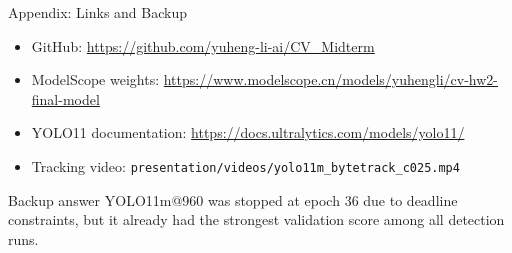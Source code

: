 \documentclass[aspectratio=169,9pt]{beamer}
\begin{document}
\begin{frame}{Appendix: Links and Backup}
  \begin{itemize}
    \item GitHub: \url{https://github.com/yuheng-li-ai/CV_Midterm}
    \item ModelScope weights: \url{https://www.modelscope.cn/models/yuhengli/cv-hw2-final-model}
    \item YOLO11 documentation: \url{https://docs.ultralytics.com/models/yolo11/}
    \item Tracking video: \texttt{presentation/videos/yolo11m\_bytetrack\_c025.mp4}
  \end{itemize}
  \begin{block}{Backup answer}
    YOLO11m@960 was stopped at epoch 36 due to deadline constraints, but it already had the strongest validation score among all detection runs.
  \end{block}
\end{frame}
\end{document}
